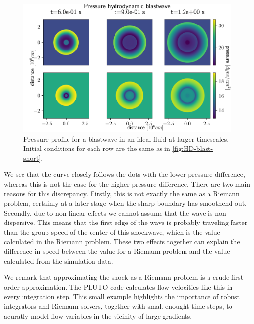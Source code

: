 \begin{figure}[H]
	\centering
	\includegraphics[width=\linewidth]{images/HD-blast-prs-2.pdf}
	\caption{Pressure profile for a blastwave in an ideal fluid at larger timescales. Initial conditions for each row are the same as in \cref{fig:HD-blast-short}.}
	\label{fig:HD-blast-long}
\end{figure}

We see that the curve closely follows the dots with the lower pressure difference, whereas this is not the case for the higher pressure difference.
There are two main reasons for this discrepancy. 
Firstly, this is not exactly the same as a Riemann problem, certainly at a later stage when the sharp boundary has smoothend out.
Secondly, due to non-linear effects we cannot assume that the wave is non-dispersive. 
This means that the first edge of the wave is probably traveling faster than the group speed of the center of this shockwave, which is the value calculated in the Riemann problem.
These two effects together can explain the difference in speed between the value for a Riemann problem and the value calculated from the simulation data.

We remark that approximating the shock as a Riemann problem is a crude first-order approximation. 
The PLUTO code calculates flow velocities like this in every integration step. 
This small example highlights the importance of robust integrators and Riemann solvers, together with small enought time steps, to acuratly model flow variables in the vicinity of large gradients.

